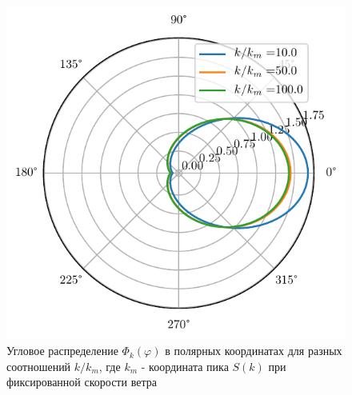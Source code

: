 \documentclass[10pt,pdf,hyperref={unicode}, dvipsnames]{beamer}
\renewcommand{\phi}{\varphi}
\begin{document}
\begin{frame}[t]
\begin{figure}[h!]
\begin{minipage}{0.49\linewidth}
			\includegraphics[width=\linewidth]{fig/full_angles2.pdf}
	\end{minipage}
	\caption{Угловое распределение $\Phi_k(\phi)$ в полярных координатах для разных соотношений $k/k_m$, где $k_m$ - координата пика $S(k)$ при фиксированной скорости ветра}
	\label{fig:full_angles}
\end{figure}

\end{frame}
\end{document}
